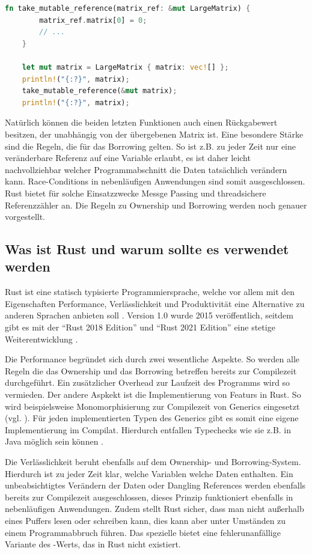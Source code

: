 \documentclass[11pt,a4paper, ngerman]{article}
\begin{document}
\begin{lstlisting}[language=rust, caption={Einführendes Beispiel: Veränderliche Referenz}]
    fn take_mutable_reference(matrix_ref: &mut LargeMatrix) {
        matrix_ref.matrix[0] = 0;
        // ...
    }

    let mut matrix = LargeMatrix { matrix: vec![] };
    println!("{:?}", matrix);
    take_mutable_reference(&mut matrix);
    println!("{:?}", matrix);
\end{lstlisting}

Natürlich können die beiden letzten Funktionen auch einen Rückgabewert besitzen, der unabhängig von der übergebenen Matrix ist. Eine besondere Stärke sind die Regeln, die für das Borrowing gelten. So ist z.B. zu jeder Zeit nur eine veränderbare Referenz auf eine Variable erlaubt, es ist daher leicht nachvollziehbar welcher Programmabschnitt die Daten tatsächlich verändern kann. Race-Conditions in nebenläufigen Anwendungen sind somit ausgeschlossen. Rust bietet für solche Einsatzzwecke Messge Passing \cite{K1727} und threadsichere Referenzzähler \cite{ArcSrc} an. Die Regeln zu Ownership und Borrowing werden noch genauer vorgestellt.

\label{sec:kap2d2}
\subsection{Was ist Rust und warum sollte es verwendet werden}
Rust ist eine statisch typisierte Programmiersprache, welche vor allem mit den Eigenschaften Performance, Verlässlichkeit und Produktivität eine Alternative zu anderen Sprachen anbieten soll \cite{RustPromises}. Version 1.0 wurde 2015 veröffentlich, seitdem gibt es mit der ``Rust 2018 Edition'' und ``Rust 2021 Edition'' eine stetige Weiterentwicklung \cite{RustEditions}.

Die Performance begründet sich durch zwei wesentliche Aspekte. So werden alle Regeln die das Ownership und das Borrowing betreffen bereits zur Compilezeit durchgeführt. Ein zusätzlicher Overhead zur Laufzeit des Programms wird so vermieden. Der andere Aspkekt ist die Implementierung von Featurs in Rust. So wird beispielsweise Monomorphisierung zur Compilezeit von Generics eingesetzt (vgl. \cite[S. 196 ff.]{SK19}). Für jeden implementierten Typen des Generics gibt es somit eine eigene Implementierung im Compilat. Hierdurch entfallen Typechecks wie sie z.B. in Java möglich sein können \cite{JavaGenerics}.

Die Verlässlichkeit beruht ebenfalls auf dem Ownership- und Borrowing-System. Hierdurch ist zu jeder Zeit klar, welche Variablen welche Daten enthalten. Ein unbeabsichtigtes Verändern der Daten oder Dangling References werden ebenfalls bereits zur Compilezeit ausgeschlossen, dieses Prinzip funktioniert ebenfalls in nebenläufigen Anwendungen. Zudem stellt Rust sicher, dass man nicht außerhalb eines Puffers lesen oder schreiben kann, dies kann aber unter Umständen zu einem Programmabbruch führen. Das spezielle   bietet eine fehlerunanfällige Variante des -Werts, das in Rust nicht existiert.
\end{document}
